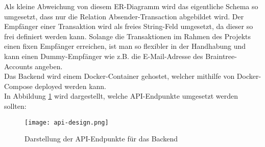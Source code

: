Als kleine Abweichung von diesem ER-Diagramm wird das eigentliche Schema so umgesetzt, dass nur die Relation Absender-Transaction abgebildet wird.
Der Empfänger einer Transaktion wird als freies String-Feld umgesetzt, da dieser so frei definiert werden kann.
Solange die Transaktionen im Rahmen des Projekts einen fixen Empfänger erreichen, ist man so flexibler in der Handhabung und kann einen Dummy-Empfänger wie z.B. die E-Mail-Adresse des Braintree-Accounts angeben.
\\
Das Backend wird einem Docker-Container gehostet, welcher mithilfe von Docker-Compose deployed werden kann.
\\
In Abbildung \ref{fig:apidesign} wird dargestellt, welche API-Endpunkte umgesetzt werden sollten:

\begin{figure}[H]
  \centering
  \texttt{[image: api-design.png]}
  \label{fig:apidesign}
  \caption{Darstellung der API-Endpunkte für das Backend}
\end{figure}

